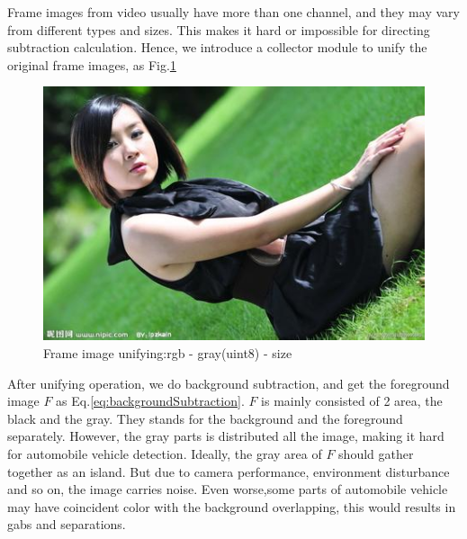 \documentclass[conference]{IEEEtran}
\begin{document}
	Frame images from video usually have more than one channel, and they may vary from different types and sizes. This makes it hard or impossible for directing subtraction calculation. Hence, we introduce a collector module to unify the original frame images, as Fig.\ref{fig:unifyDiagram}
	\begin{figure}[!h]
	\centering
	\includegraphics[width=1\linewidth]{figures/jena.jpg} 
	\caption{Frame image unifying:rgb - gray(uint8) - size}
	\label{fig:unifyDiagram}
	\end{figure}
	
	After unifying operation, we do background subtraction, and get the foreground image $F$ as Eq.\ref{eq:backgroundSubtraction}. $F$ is mainly consisted of 2 area, the black and the gray. They stands for the background and the foreground separately. However, the gray parts is distributed all the image, making it hard for automobile vehicle detection. Ideally, the gray area of $F$ should gather together as an island. But due to camera performance, environment disturbance and so on, the image carries noise. Even worse,some parts of automobile vehicle may have coincident color with the background overlapping, this would results in gabs and separations.
		
\end{document}
